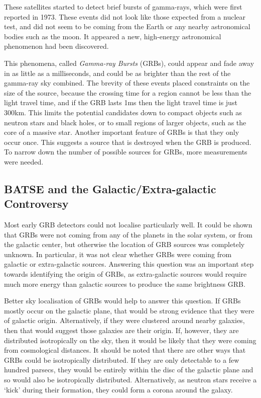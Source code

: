 \documentclass[11pt]{cuthesis}
\begin{document}
These satellites started to detect brief bursts of gamma-rays, which were first reported in 1973. These events did not look like those expected from a nuclear test, and did not seem to be coming from the Earth or any nearby astronomical bodies such as the moon. It appeared a new, high-energy astronomical phenomenon had been discovered. 

This phenomena, called \textit{Gamma-ray Bursts} (GRBs), could appear and fade away in as little as a milliseconds, and could be as brighter than the rest of the gamma-ray sky combined. The brevity of these events placed constraints on the size of the source, because the crossing time for a region cannot be less than the light travel time, and if the GRB lasts 1ms then the light travel time is just 300km. This limits the potential candidates down to compact objects such as neutron stars and black holes, or to small regions of larger objects, such as the core of a massive star. Another important feature of GRBs is that they only occur once. This suggests a source that is destroyed when the GRB is produced. To narrow down the number of possible sources for GRBs, more measurements were needed. 

\subsection{BATSE and the Galactic/Extra-galactic Controversy}
Most early GRB detectors could not localise particularly well. It could be shown that GRBs were not coming from any of the planets in the solar system, or from the galactic center, but otherwise the location of GRB sources was completely unknown. In particular, it was not clear whether GRBs were coming from galactic or extra-galactic sources. Answering this question was an important step towards identifying the origin of GRBs, as extra-galactic sources would require much more energy than galactic sources to produce the same brightness GRB. 

Better sky localisation of GRBs would help to answer this question. If GRBs mostly occur on the galactic plane, that would be strong evidence that they were of galactic origin. Alternatively, if they were clustered around nearby galaxies, then that would suggest those galaxies are their origin. If, however, they are distributed isotropically on the sky, then it would be likely that they were coming from cosmological distances. It should be noted that there are other ways that GRBs could be isotropically distributed. If they are only detectable to a few hundred parsecs, they would be entirely within the disc of the galactic plane and so would also be isotropically distributed. Alternatively, as neutron stars receive a `kick' during their formation, they could form a corona around the galaxy.
\end{document}
